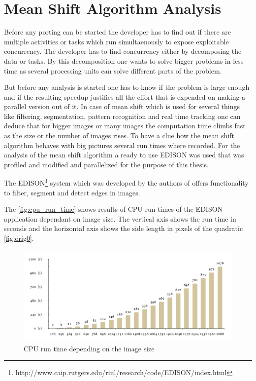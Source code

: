 \chapter{Mean Shift Algorithm Analysis} %
\label{cha:algorithm_analysis}
Before any porting can be started the developer has to find out if there are 
multiple activities or tasks which run simultaenously to expose exploitable 
concurrency. The developer has to find concurrency either by decomposing the  
data or tasks. By this decomposition one wants to solve bigger problems in less 
time as several processing units can solve different parts of the problem. 

But before any analysis is started one has to know if the problem is large enough
and if the resulting speedup justifies all the effort that is expended on making
a parallel version out of it. In case of mean shift which is used for several 
things like filtering, segmentation, pattern recognition and real time tracking
one can deduce that for bigger images or many images the computation time climbs
fast as the size or the number of images rises. To have a clue how the mean 
shift algorithm behaves with big pictures several run times where recorded.
For the analysis of the mean shift algorithm a ready to use \gls{EDISON} 
was used that was profiled and modified and parallelized for the purpose of this 
thesis.

The
\gls{EDISON}\footnote{http://www.caip.rutgers.edu/riul/research/code/EDISON/index.html}
system which was developed by the authors  \citeauthor{citeulike:462300} of
\citep{citeulike:462300} offers functionality to filter, segment and detect
edges in images. 

The \autoref{fig:cpu_run_time}
shows results of \gls{CPU} run times of the \gls{EDISON} application dependant
on image size. The vertical axis shows the run time in seconds and the
horizontal axis shows the side length in pixels of the quadratic \autoref{fig:orig0}.

\begin{figure}[ht]
\centering
\includegraphics[width=390pt]{gfx/cpu_run_time}
\caption{CPU run time depending on the image size}
\label{fig:cpu_run_time}
\end{figure}




